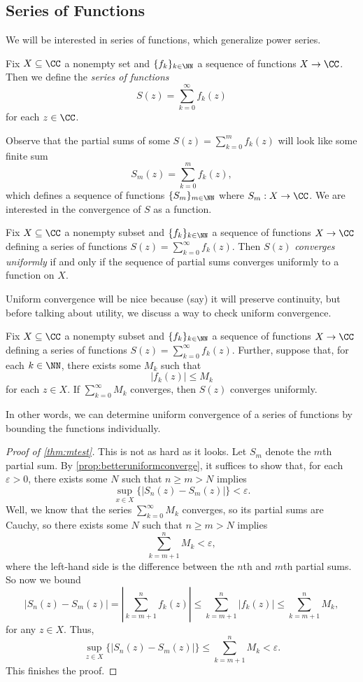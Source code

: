 \subsection{Series of Functions}
We will be interested in series of functions, which generalize power series.
\begin{definition}
	Fix $X\subseteq\CC$ a nonempty set and $\{f_k\}_{k\in\NN}$ a sequence of functions $X\to\CC$. Then we define the \textit{series of functions}
	\[S(z)=\sum_{k=0}^\infty f_k(z)\]
	for each $z\in\CC$.
\end{definition}
Observe that the partial sums of some $S(z)=\sum_{k=0}^mf_k(z)$ will look like some finite sum
\[S_m(z)=\sum_{k=0}^mf_k(z),\]
which defines a sequence of functions $\{S_m\}_{m\in\NN}$ where $S_m:X\to\CC$. We are interested in the convergence of $S$ as a function.
\begin{definition}
	Fix $X\subseteq\CC$ a nonempty subset and $\{f_k\}_{k\in\NN}$ a sequence of functions $X\to\CC$ defining a series of functions $S(z)=\sum_{k=0}^\infty f_k(z)$. Then $S(z)$ \textit{converges uniformly} if and only if the sequence of partial sums converges uniformly to a function on $X$.
\end{definition}
Uniform convergence will be nice because (say) it will preserve continuity, but before talking about utility, we discuss a way to check uniform convergence.
\begin{theorem} \label{thm:mtest}
	Fix $X\subseteq\CC$ a nonempty subset and $\{f_k\}_{k\in\NN}$ a sequence of functions $X\to\CC$ defining a series of functions $S(z)=\sum_{k=0}^\infty f_k(z)$. Further, suppose that, for each $k\in\NN$, there exists some $M_k$ such that
	\[|f_k(z)|\le M_k\]
	for each $z\in X$. If $\sum_{k=0}^\infty M_k$ converges, then $S(z)$ converges uniformly.
\end{theorem}
In other words, we can determine uniform convergence of a series of functions by bounding the functions individually.
\begin{proof}[Proof of \autoref{thm:mtest}]
	This is not as hard as it looks. Let $S_m$ denote the $m$th partial sum. By \autoref{prop:betteruniformconverge}, it suffices to show that, for each $\varepsilon>0$, there exists some $N$ such that $n\ge m>N$ implies
	\[\sup_{x\in X}\{|S_n(z)-S_m(z)|\}<\varepsilon.\]
	Well, we know that the series $\sum_{k=0}^\infty M_k$ converges, so its partial sums are Cauchy, so there exists some $N$ such that $n\ge m>N$ implies
	\[\sum_{k=m+1}^nM_k<\varepsilon,\]
	where the left-hand side is the difference between the $n$th and $m$th partial sums. So now we bound
	\[|S_n(z)-S_m(z)|=\left|\sum_{k=m+1}^nf_k(z)\right|\le\sum_{k=m+1}^n|f_k(z)|\le\sum_{k=m+1}^nM_k,\]
	for any $z\in X$. Thus,
	\[\sup_{z\in X}\{|S_n(z)-S_m(z)|\}\le\sum_{k=m+1}^nM_k<\varepsilon.\]
	This finishes the proof.
\end{proof}
